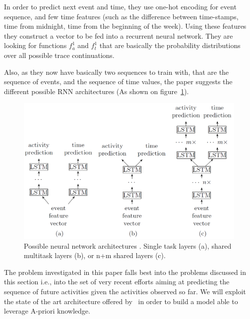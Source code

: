 In order to predict next event and time, they use one-hot encoding for event sequence, and few time features (such as the difference between time-stamps, time from midnight, time from the beginning of the week). Using these features they construct a vector to be fed into a recurrent neural network. They are looking for functions $f_a^1$ and $f_t^1$ that are basically the probability distributions over all possible trace continuations.

Also, as they now have basically two sequences to train with, that are the sequence of events, and the sequence of time values, the paper suggests the different possible RNN architectures (As shown on figure~\ref{figure:architectureslstm}). 

\begin{figure}[!ht]
	\begin{center}  
		\includegraphics[width=\textwidth]{1.png}
		\caption{Possible neural network architectures \cite{niek96732}. Single task layers (a), shared multitask layers (b), or n+m shared layers (c).}
		\label{figure:architectureslstm}	
	\end{center}
\end{figure}



The problem investigated in this paper falls best into the problems discussed in this section i.e., into the set of very recent efforts aiming at predicting the sequence of future activities given the activities observed so far. We will exploit the state of the art architecture offered by~\cite{niek96732} in order to build a model able to leverage A-priori knowledge.

